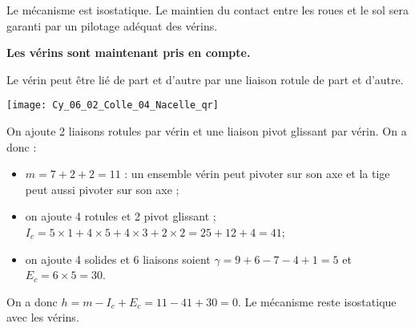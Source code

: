 \ifprof
\begin{corrige}
Le mécanisme est isostatique. Le maintien du contact entre les roues et le sol sera garanti par un pilotage adéquat des vérins.
\end{corrige}
\else\fi


\textbf{Les vérins sont maintenant pris en compte.}

\ifprof
\begin{corrige}
Le vérin peut être lié de part et d'autre par une liaison rotule de part et d'autre. 
\end{corrige}
\else\fi

\ifprof
\else
\begin{marginfigure}
\centering
\texttt{[image: Cy\_06\_02\_Colle\_04\_Nacelle\_qr]}
\end{marginfigure}
\fi


\ifprof
\begin{corrige}
On ajoute 2 liaisons rotules par vérin et une liaison pivot glissant par vérin.
On a donc : 
\begin{itemize}
\item $m=7+2+2 = 11$ : un ensemble vérin peut pivoter sur son axe et la tige peut aussi pivoter sur son axe ;
\item on ajoute 4 rotules et 2 pivot glissant ; $I_c = 5\times 1 + 4\times 5+ 4\times 3+ 2\times 2 = 25+12+4 = 41 $;
\item on ajoute 4 solides et 6 liaisons soient $\gamma = 9+6-7-4+1 = 5$ et $E_c = 6\times 5 = 30$.
\end{itemize}
On a donc $h=m-I_c+E_c = 11 - 41 + 30 =0$. Le mécanisme reste isostatique avec les vérins. 
\end{corrige}
\else\fi
